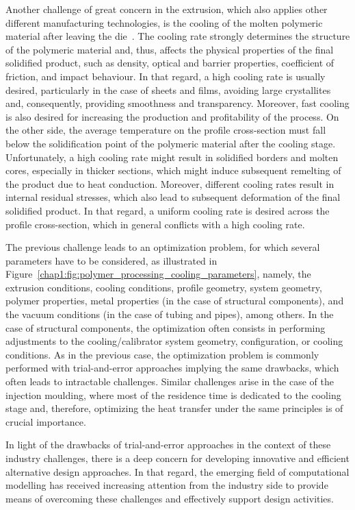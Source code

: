 Another challenge of great concern in the extrusion, which also applies other different manufacturing technologies, is the cooling of the molten polymeric material after leaving the die~\cite{chap1:2017rajkumar}.
The cooling rate strongly determines the structure of the polymeric material and, thus, affects the physical properties of the final solidified product, such as density, optical and barrier properties, coefficient of friction, and impact behaviour.
In that regard, a high cooling rate is usually desired, particularly in the case of sheets and films, avoiding large crystallites and, consequently, providing smoothness and transparency.
Moreover, fast cooling is also desired for increasing the production and profitability of the process.
On the other side, the average temperature on the profile cross-section must fall below the solidification point of the polymeric material after the cooling stage.
Unfortunately, a high cooling rate might result in solidified borders and molten cores, especially in thicker sections, which might induce subsequent remelting of the product due to heat conduction.
Moreover, different cooling rates result in internal residual stresses, which also lead to subsequent deformation of the final solidified product.
In that regard, a uniform cooling rate is desired across the profile cross-section, which in general conflicts with a high cooling rate.

The previous challenge leads to an optimization problem, for which several parameters have to be considered, as illustrated in Figure~\ref{chap1:fig:polymer_processing_cooling_parameters}, namely, the extrusion conditions, cooling conditions, profile geometry, system geometry, polymer properties, metal properties (in the case of structural components), and the vacuum conditions (in the case of tubing and pipes), among others.
In the case of structural components, the optimization often consists in performing adjustments to the cooling/calibrator system geometry, configuration, or cooling conditions.
As in the previous case, the optimization problem is commonly performed with trial-and-error approaches implying the same drawbacks, which often leads to intractable challenges.
Similar challenges arise in the case of the injection moulding, where most of the residence time is dedicated to the cooling stage and, therefore, optimizing the heat transfer under the same principles is of crucial importance.

In light of the drawbacks of trial-and-error approaches in the context of these industry challenges, there is a deep concern for developing innovative and efficient alternative design approaches.
In that regard, the emerging field of computational modelling has received increasing attention from the industry side to provide means of overcoming these challenges and effectively support design activities.

